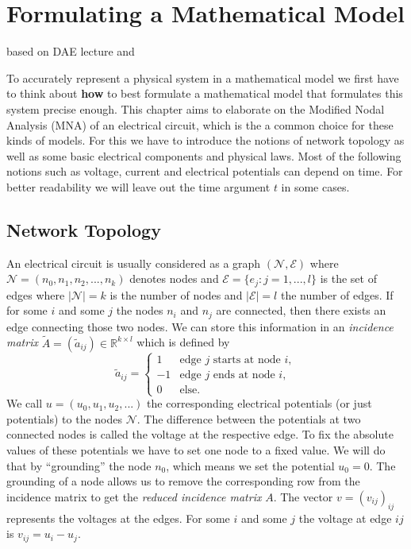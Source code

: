 \chapter{Formulating a Mathematical Model}
based on DAE lecture and \cite{ModellingAndDiscretizationOfCircuitProblems}

To accurately represent a physical system in a mathematical model we first have to think about \textbf{how} to best formulate a mathematical model that formulates this system precise enough.
This chapter aims to elaborate on the Modified Nodal Analysis (MNA) of an electrical circuit, which is the a common choice for these kinds of models. For this we have to introduce the notions of network topology as well as some basic electrical components and physical laws. Most of the following notions such as voltage, current and electrical potentials can depend on time. For better readability we will leave out the time argument $t$ in some cases.

\section{Network Topology}
\label{Sec:Network Topology}
An electrical circuit is usually considered as a graph $(\mathcal{N},\mathcal{E})$ where $\mathcal{N} = (n_0, n_1, n_2, ..., n_k)$ denotes nodes and $\mathcal{E} = \{e_{j}: j = 1,...,l\}$ is the set of edges where $|\mathcal{N}| = k$ is the number of nodes and $|\mathcal{E}| = l$ the number of edges. If for some $i$ and some $j$ the nodes $n_i$ and  $n_j$ are connected, then there exists an edge connecting those two nodes.
We can store this information in an \emph{incidence matrix} $\tilde{A} = (\tilde{a}_{ij}) \in \mathbb{R}^{k \times l}$ which is defined by
\begin{displaymath}
	\tilde{a}_{ij} = 
	\begin{cases}
		1 &   \text{edge $j$ starts at node $i$},\\
		-1 &  \text{edge $j$  ends at node $i$},\\
		0 & \text{else}.				
	\end{cases}
\end{displaymath}
We call $u = (u_0, u_1, u_2, ...)$ the corresponding electrical potentials (or just potentials) to the nodes $\mathcal{N}$. The difference between the potentials at two connected nodes is called the voltage at the respective edge. To fix the absolute values of these potentials we have to set one node to a fixed value. We will do that by ``grounding'' the node $n_0$, which means we set the potential $u_0 = 0$. The grounding of a node allows us to remove the corresponding row from the incidence matrix to get the \emph{reduced incidence matrix} $A$. The vector $v = (v_{ij})_{ij}$ represents the voltages at the edges. For some $i$ and some $j$ the voltage at edge $ij$ is $v_{ij} = u_i - u_j$.

